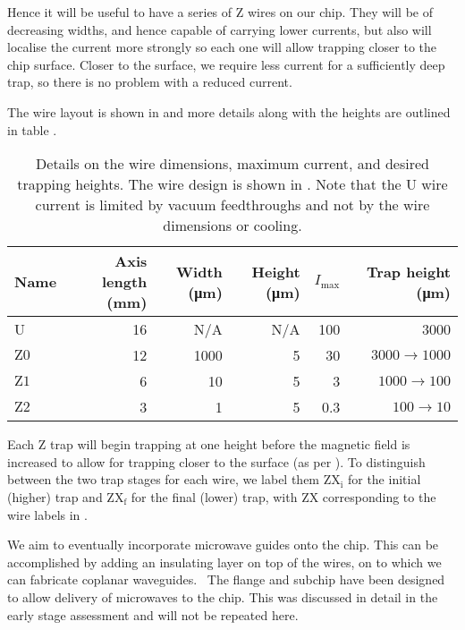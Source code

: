 Hence it will be useful to have a series of Z wires on our chip. They will
be of decreasing widths, and hence capable of carrying lower currents, but also
will localise the current more strongly so each one will allow trapping closer
to the chip surface. Closer to the surface, we require less current for a
sufficiently deep trap, so there is no problem with a reduced current.

The wire layout is shown
in  and more details along with the
heights are outlined in table . 

\begin{table}
  \centering
\begin{tabular}{lrrrrr}
  Name & Axis length (\si{\milli\meter}) & Width (\si{\micro\meter})& Height (\si{\micro\meter})& $I_\text{max}$ & Trap height (\si{\micro\meter}) \\
 \hline
  U & 16 & N/A& N/A& 100 & 3000\\
  $\mathrm{Z0}$ & 12 & 1000&  5& 30& $3000\rightarrow1000$ \\
  $\mathrm{Z1}$ &  6 & 10&  5& 3& $1000\rightarrow100$ \\
  $\mathrm{Z2}$ &  3 & 1&  5& 0.3& $100\rightarrow10$ \\
 \hline
\end{tabular}
  \caption{Details on the wire dimensions, maximum current, and desired
  trapping heights. The wire design is shown in
  . Note that the U wire current is
  limited by vacuum feedthroughs and not by the wire dimensions or cooling.
  }
  \label{design:table:wires}
\end{table}

Each Z trap will begin trapping at one height before the magnetic field is
increased to allow for trapping closer to the surface (as per
).  To distinguish between the two trap stages for
each wire, we label them $\mathrm{ZX_i}$ for the initial (higher) trap and
$\mathrm{ZX_f}$ for the final (lower) trap, with $\mathrm{ZX}$ corresponding to
the wire labels in .

We aim to eventually incorporate microwave guides onto the chip. This can be
accomplished by adding an insulating layer on top of the wires, on to which we
can fabricate coplanar waveguides.~\cite{1127105} The flange and subchip have
been designed to allow delivery of microwaves to the chip.  This was discussed in detail in the early stage
assessment and will not be repeated here.

